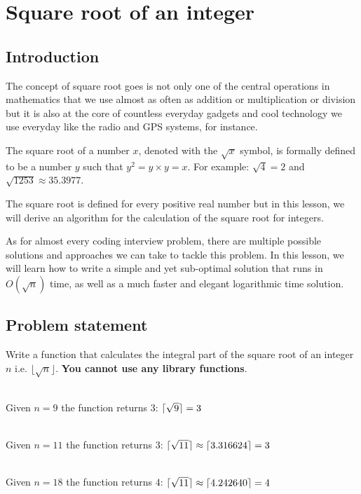 %


\chapter{Square root of an integer}
\label{ch:square_root}
\section*{Introduction}

The concept of square root goes is not only one of the central operations in mathematics that we use almost as often as addition or multiplication or division but it is also at the core of countless everyday gadgets and cool technology we use everyday like the radio and GPS systems, for instance.

The square root of a number $x$, denoted with the $\sqrt{x}$ symbol, is formally defined to be a number $y$ such that $y^2 = y\times y=x$.
For example: $\sqrt{4} = 2$ and $\sqrt{1253} \approx 35.3977$.

The square root is defined for every positive real number but in this lesson, we will derive an algorithm for the calculation of the square root for integers.

As for almost every coding interview problem, there are multiple possible solutions and approaches we can take to tackle this problem. 
In this lesson, we will learn how to write a simple and yet sub-optimal solution that runs in $O(\sqrt{n})$ time,
as well as a much faster and elegant logarithmic time solution.


\section{Problem statement}
	\begin{exercise}
		Write a function that calculates the integral part of the square root of an integer $n$ i.e. $\lfloor \sqrt{n}\rfloor$.
		\textbf{You cannot use any library functions}.


	\begin{example}
	\hfill \\
	Given $n=9$ the function returns $3$: $\lceil\sqrt{9}\rceil=3$
	\end{example}

	\begin{example}
		\hfill \\
		Given $n=11$ the function returns $3$: $\lceil\sqrt{11}\rceil\approx\lceil3.316624\rceil=3$
	\end{example}

	\begin{example}
		\hfill \\
		Given $n=18$ the function returns $4$: $\lceil\sqrt{11}\rceil\approx\lceil4.242640\rceil=4$
	\end{example}
	
\end{exercise}

